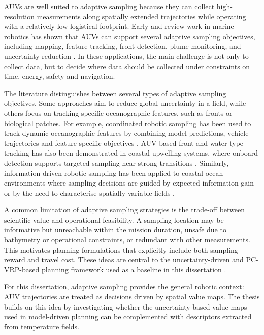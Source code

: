 AUVs are well suited to adaptive sampling because they can collect high-resolution measurements along spatially extended trajectories while operating with a relatively low logistical footprint. Early and review work in marine robotics has shown that AUVs can support several adaptive sampling objectives, including mapping, feature tracking, front detection, plume monitoring, and uncertainty reduction \parencite{curtin2009aosn,hwang2019auvreview,bellingham2007robotics}. In these applications, the main challenge is not only to collect data, but to decide where data should be collected under constraints on time, energy, safety and navigation.

The literature distinguishes between several types of adaptive sampling objectives. Some approaches aim to reduce global uncertainty in a field, while others focus on tracking specific oceanographic features, such as fronts or biological patches. For example, coordinated robotic sampling has been used to track dynamic oceanographic features by combining model predictions, vehicle trajectories and feature-specific objectives \parencite{das2012coordinated}. AUV-based front and water-type tracking has also been demonstrated in coastal upwelling systems, where onboard detection supports targeted sampling near strong transitions \parencite{zhang2012upwellingfront,zhang2012watertypesfronts}. Similarly, information-driven robotic sampling has been applied to coastal ocean environments where sampling decisions are guided by expected information gain or by the need to characterise spatially variable fields \parencite{fossum2018informationdriven,fossum2019phytoplankton}.

A common limitation of adaptive sampling strategies is the trade-off between scientific value and operational feasibility. A sampling location may be informative but unreachable within the mission duration, unsafe due to bathymetry or operational constraints, or redundant with other measurements. This motivates planning formulations that explicitly include both sampling reward and travel cost. These ideas are central to the uncertainty-driven and PC-VRP-based planning framework used as a baseline in this dissertation \parencite{bernacchi2025closingloop}.

For this dissertation, adaptive sampling provides the general robotic context: AUV trajectories are treated as decisions driven by spatial value maps. The thesis builds on this idea by investigating whether the uncertainty-based value maps used in model-driven planning can be complemented with descriptors extracted from temperature fields.

